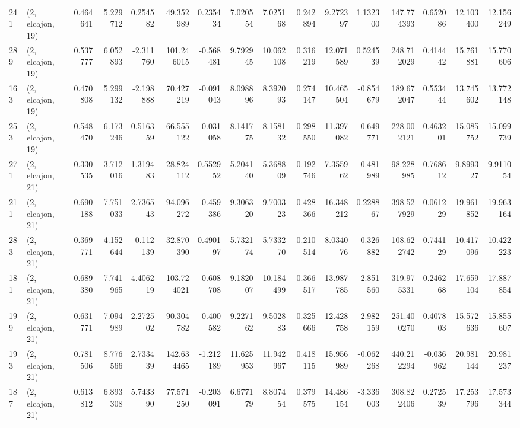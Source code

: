 \begin{tabular}{llrrrrrrrrrrrrrr}
241 &  (2, elcajon, 19) &   0.464641 &   5.229712 &   0.254582 &    49.352989 &   0.235434 &   7.020554 &   7.025168 &  0.242894 &   9.272397 &   1.132300 &   147.774393 &   0.652086 &  12.103400 &  12.156249 \\
289 &  (2, elcajon, 19) &   0.537777 &   6.052893 &  -2.311760 &   101.246015 &  -0.568481 &   9.792945 &  10.062108 &  0.316219 &  12.071589 &   0.524539 &   248.712029 &   0.414442 &  15.761881 &  15.770606 \\
163 &  (2, elcajon, 19) &   0.470808 &   5.299132 &  -2.198888 &    70.427219 &  -0.091043 &   8.098896 &   8.392093 &  0.274147 &  10.465504 &  -0.854679 &   189.672047 &   0.553444 &  13.745602 &  13.772148 \\
253 &  (2, elcajon, 19) &   0.548470 &   6.173246 &   0.516359 &    66.555122 &  -0.031058 &   8.141775 &   8.158132 &  0.298550 &  11.397082 &  -0.649771 &   228.002121 &   0.463201 &  15.085752 &  15.099739 \\
271 &  (2, elcajon, 21) &   0.330535 &   3.712016 &   1.319483 &    28.824112 &   0.552952 &   5.204140 &   5.368809 &  0.192746 &   7.355962 &  -0.481989 &    98.228985 &   0.768612 &   9.899327 &   9.911054 \\
211 &  (2, elcajon, 21) &   0.690188 &   7.751033 &   2.736543 &    94.096272 &  -0.459386 &   9.306320 &   9.700323 &  0.428366 &  16.348212 &   0.228867 &   398.527929 &   0.061229 &  19.961852 &  19.963164 \\
283 &  (2, elcajon, 21) &   0.369771 &   4.152644 &  -0.112139 &    32.870390 &   0.490197 &   5.732174 &   5.733270 &  0.210514 &   8.034076 &  -0.326882 &   108.622742 &   0.744129 &  10.417096 &  10.422223 \\
181 &  (2, elcajon, 21) &   0.689380 &   7.741965 &   4.406219 &   103.724021 &  -0.608708 &   9.182007 &  10.184499 &  0.366517 &  13.987785 &  -2.851560 &   319.975331 &   0.246268 &  17.659104 &  17.887854 \\
199 &  (2, elcajon, 21) &   0.631771 &   7.094989 &   2.272502 &    90.304782 &  -0.400582 &   9.227162 &   9.502883 &  0.325666 &  12.428758 &  -2.982159 &   251.400270 &   0.407803 &  15.572636 &  15.855607 \\
193 &  (2, elcajon, 21) &   0.781506 &   8.776566 &   2.733439 &   142.634465 &  -1.212189 &  11.625953 &  11.942967 &  0.418115 &  15.956989 &  -0.062268 &   440.212294 &  -0.036962 &  20.981144 &  20.981237 \\
187 &  (2, elcajon, 21) &   0.613812 &   6.893308 &   5.743390 &    77.571250 &  -0.203091 &   6.677179 &   8.807454 &  0.379575 &  14.486154 &  -3.336003 &   308.822406 &   0.272539 &  17.253796 &  17.573344 \\

\end{tabular}
